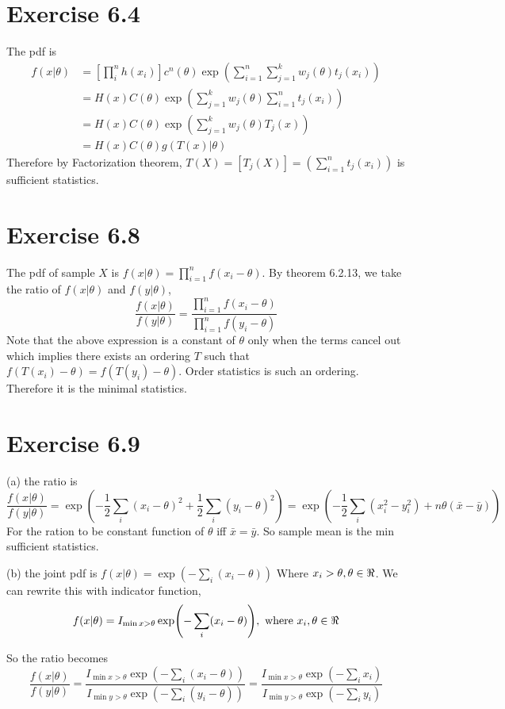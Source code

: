 \documentclass[12pt]{article}
\begin{document}
\section*{Exercise 6.4}
The pdf is $$
\begin{aligned}
	f(x|\theta) &= \left[\prod_i^n h(x_i) \right] c^n(\theta) \exp \left( \sum_{i=1}^{n} \sum_{j=1}^k w_j(\theta)t_j(x_i) \right) \\
	&= H(x)C(\theta) \exp \left(  \sum_{j=1}^k w_j(\theta)\sum_{i=1}^{n} t_j(x_i) \right) \\
	&= H(x)C(\theta) \exp \left(  \sum_{j=1}^k w_j(\theta)T_j(x) \right) \\
	&= H(x)C(\theta)g(T(x)|\theta)
\end{aligned}
$$
Therefore by Factorization theorem,  $T(X) = [T_j(X)] =  \left( \sum_{i=1}^{n} t_j(x_i) \right) $ is sufficient statistics.

\section*{Exercise 6.8}
The pdf of sample $X$ is $f(x|\theta) = \prod_{i=1}^n f(x_i - \theta)$. By theorem 6.2.13, we take the ratio of $f(x|\theta)$ and $f(y|\theta)$,  $$ \frac{f(x|\theta)}{f(y|\theta)} = \frac{\prod_{i=1}^n f(x_i - \theta)}{\prod_{i=1}^n f(y_i - \theta)}$$
Note that the above expression is a constant of $\theta$ only when the terms cancel out which implies there exists an ordering $T$ such that $f(T(x_i) - \theta) = f(T(y_i) - \theta)$. Order statistics is such an ordering. Therefore it is the minimal statistics.

\section*{Exercise 6.9}
(a) the ratio is $$\frac{f(x|\theta)}{f(y|\theta)} = \exp\left( -\frac{1}{2} \sum_i (x_i - \theta)^2 + \frac{1}{2} \sum_i (y_i-\theta)^2 \right) =\exp\left( -\frac{1}{2} \sum_i (x_i^2 - y_i^2) + n \theta (\bar{x} - \bar{y}) \right)$$ 
For the ration to be constant function of $\theta$ iff $\bar{x} = \bar{y}$. So sample mean is the min sufficient statistics.

(b) the joint pdf is $f(x|\theta) = \exp( -\sum_i (x_i - \theta))$ Where $x_i > \theta, \theta \in \real$. We can rewrite this with indicator function, $$f(x|\theta) = I_{\min{x} > \theta } \exp( -\sum_i (x_i - \theta)), \mbox{  where  } x_i,\theta \in \real$$

So the ratio becomes 
$$
\frac{f(x|\theta)}{f(y|\theta)} = \frac{I_{\min{x} > \theta } \exp( -\sum_i (x_i - \theta))}{I_{\min{y} > \theta } \exp( -\sum_i (y_i - \theta))} =  \frac{I_{\min{x} > \theta } \exp( -\sum_i x_i) }{I_{\min{y} > \theta } \exp( -\sum_i y_i )}
$$
\end{document}
